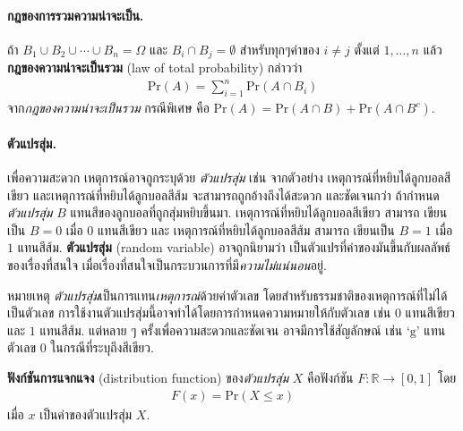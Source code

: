 \paragraph{กฎของการรวมความน่าจะเป็น.}
ถ้า $B_1 \cup B_2 \cup \cdots \cup B_n = \Omega$
และ $B_i \cap B_j = \emptyset$ สำหรับทุกๆค่าของ $i \neq j$ ตั้งแต่ $1, \ldots, n$
แล้ว
\textbf{กฎของความน่าจะเป็นรวม} (law of total probability)
กล่าวว่า
\begin{eqnarray}
\mathrm{Pr}(A) = \sum_{i=1}^n \mathrm{Pr}(A \cap B_i)
\label{eq: prob law of total prob}
\end{eqnarray}
จาก\textit{กฎของความน่าจะเป็นรวม}
กรณีพิเศษ คือ $\mathrm{Pr}(A) = \mathrm{Pr}(A \cap B) + \mathrm{Pr}(A \cap B^c)$.

\paragraph{ตัวแปรสุ่ม.}
เพื่อความสะดวก
เหตุการณ์อาจถูกระบุด้วย
\textit{ตัวแปรสุ่ม} 
เช่น จากตัวอย่าง
เหตุการณ์ที่หยิบได้ลูกบอลสีเขียว
และเหตุการณ์ที่หยิบได้ลูกบอลสีส้ม
จะสามารถถูกอ้างถึงได้สะดวก และชัดเจนกว่า
ถ้ากำหนด \textit{ตัวแปรสุ่ม} $B$ แทนสีของลูกบอลที่ถูกสุ่มหยิบขึ้นมา.
เหตุการณ์ที่หยิบได้ลูกบอลสีเขียว 
สามารถ เขียนเป็น $B = 0$
เมื่อ $0$ แทนสีเขียว %
และ 
เหตุการณ์ที่หยิบได้ลูกบอลสีส้ม 
สามารถ เขียนเป็น $B = 1$
เมื่อ $1$ แทนสีส้ม.
\textbf{ตัวแปรสุ่ม} (random variable)
อาจถูกนิยามว่า
เป็นตัวแปรที่ค่าของมันขึ้นกับผลลัพธ์ของเรื่องที่สนใจ เมื่อเรื่องที่สนใจเป็นกระบวนการที่มี\textit{ความไม่แน่นอน}อยู่.

หมายเหตุ \textit{ตัวแปรสุ่ม}เป็นการแทน\textit{เหตุการณ์}ด้วยค่าตัวเลข
โดยสำหรับธรรมชาติของเหตุการณ์ที่ไม่ได้เป็นตัวเลข การใช้งานตัวแปรสุ่มนี้อาจทำได้โดยการกำหนดความหมายให้กับตัวเลข 
เช่น $0$ แทนสีเขียว และ $1$ แทนสีส้ม.
แต่หลาย ๆ ครั้งเพื่อความสะดวกและชัดเจน
อาจมีการใช้สัญลักษณ์ เช่น
$\mbox{`g'}$ แทนตัวเลข $0$ ในกรณีที่ระบุถึงสีเขียว.

\textbf{ฟังก์ชันการแจกแจง} (distribution function)
	ของ\textit{ตัวแปรสุ่ม} $X$
คือฟังก์ชัน 
$F: \mathbb{R} \rightarrow [0,1]$ 
โดย
\begin{eqnarray}
F(x) = \mathrm{Pr}(X \leq x)
\label{eq: cdf}
\end{eqnarray}
เมื่อ $x$ เป็นค่าของตัวแปรสุ่ม $X$.

